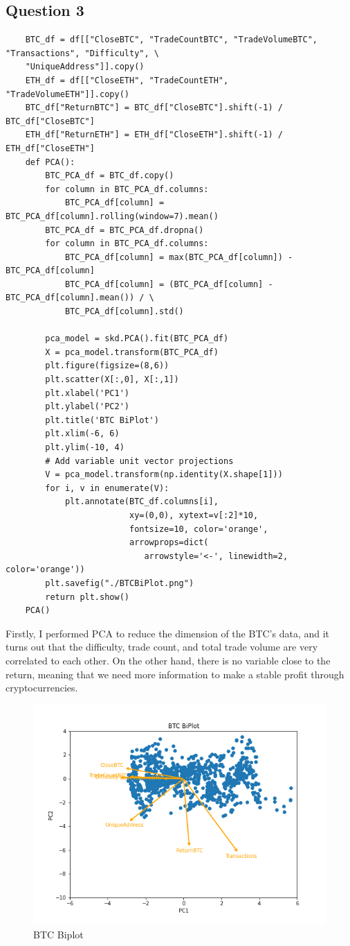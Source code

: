 \documentclass[a4paper]{article}
\begin{document}
\subsection{Question 3}
\begin{verbatim}
    BTC_df = df[["CloseBTC", "TradeCountBTC", "TradeVolumeBTC", "Transactions", "Difficulty", \
    "UniqueAddress"]].copy()
    ETH_df = df[["CloseETH", "TradeCountETH", "TradeVolumeETH"]].copy()
    BTC_df["ReturnBTC"] = BTC_df["CloseBTC"].shift(-1) / BTC_df["CloseBTC"]
    ETH_df["ReturnETH"] = ETH_df["CloseETH"].shift(-1) / ETH_df["CloseETH"]
    def PCA():
        BTC_PCA_df = BTC_df.copy()
        for column in BTC_PCA_df.columns:
            BTC_PCA_df[column] = BTC_PCA_df[column].rolling(window=7).mean()
        BTC_PCA_df = BTC_PCA_df.dropna()
        for column in BTC_PCA_df.columns:
            BTC_PCA_df[column] = max(BTC_PCA_df[column]) - BTC_PCA_df[column]
            BTC_PCA_df[column] = (BTC_PCA_df[column] - BTC_PCA_df[column].mean()) / \
            BTC_PCA_df[column].std()
        
        pca_model = skd.PCA().fit(BTC_PCA_df)
        X = pca_model.transform(BTC_PCA_df)
        plt.figure(figsize=(8,6))
        plt.scatter(X[:,0], X[:,1])
        plt.xlabel('PC1')
        plt.ylabel('PC2')
        plt.title('BTC BiPlot')
        plt.xlim(-6, 6)
        plt.ylim(-10, 4)
        # Add variable unit vector projections
        V = pca_model.transform(np.identity(X.shape[1]))
        for i, v in enumerate(V):
            plt.annotate(BTC_df.columns[i], 
                         xy=(0,0), xytext=v[:2]*10, 
                         fontsize=10, color='orange',
                         arrowprops=dict(
                            arrowstyle='<-', linewidth=2, color='orange'))
        plt.savefig("./BTCBiPlot.png")
        return plt.show()
    PCA()
\end{verbatim}
Firstly, I performed PCA to reduce the dimension of the BTC's data, and it turns out that the difficulty, trade count, and total trade volume are very correlated to each other. On the other hand, there is no variable close to the return, meaning that we need more information to make a stable profit through cryptocurrencies.
\begin{figure}[H]
    \centering
    \includegraphics[scale=0.5]{BTCBiPlot.png}
    \caption{BTC Biplot}
\end{figure}
\end{document}
